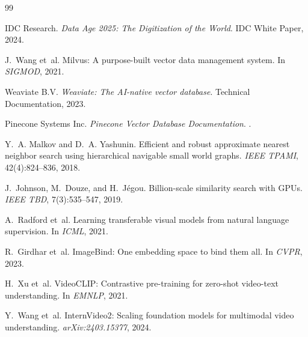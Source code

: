 ﻿\documentclass[12pt,a4paper]{article}
\begin{document}

\begin{thebibliography}{99}
\small

IDC Research.
\newblock \textit{Data Age 2025: The Digitization of the World}.
\newblock IDC White Paper, 2024.

J.~Wang et~al.
\newblock Milvus: A purpose-built vector data management system.
\newblock In \textit{SIGMOD}, 2021.

Weaviate B.V.
\newblock \textit{Weaviate: The AI-native vector database}.
\newblock Technical Documentation, 2023.

Pinecone Systems Inc.
\newblock \textit{Pinecone Vector Database Documentation}.
.

Y.~A. Malkov and D.~A. Yashunin.
\newblock Efficient and robust approximate nearest neighbor search using
  hierarchical navigable small world graphs.
\newblock \textit{IEEE TPAMI}, 42(4):824--836, 2018.

J.~Johnson, M.~Douze, and H.~Jégou.
\newblock Billion-scale similarity search with GPUs.
\newblock \textit{IEEE TBD}, 7(3):535--547, 2019.

A.~Radford et~al.
\newblock Learning transferable visual models from natural language supervision.
\newblock In \textit{ICML}, 2021.

R.~Girdhar et~al.
\newblock ImageBind: One embedding space to bind them all.
\newblock In \textit{CVPR}, 2023.

H.~Xu et~al.
\newblock VideoCLIP: Contrastive pre-training for zero-shot video-text
  understanding.
\newblock In \textit{EMNLP}, 2021.

Y.~Wang et~al.
\newblock InternVideo2: Scaling foundation models for multimodal video
  understanding.
\newblock \textit{arXiv:2403.15377}, 2024.


\end{thebibliography}
\end{document}
